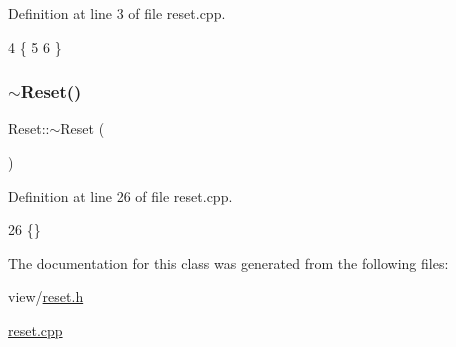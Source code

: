 Definition at line 3 of file reset.\+cpp.


\begin{DoxyCode}
4 \{
5 
6 \}
\end{DoxyCode}
\hypertarget{class_reset_a1d5b1c4b9325560ff386c64e3e6de0f0}{}\label{class_reset_a1d5b1c4b9325560ff386c64e3e6de0f0} 
\subsubsection{\texorpdfstring{$\sim$\+Reset()}{~Reset()}}
{\footnotesize\ttfamily Reset\+::$\sim$\+Reset (\begin{DoxyParamCaption}{ }\end{DoxyParamCaption})}



Definition at line 26 of file reset.\+cpp.


\begin{DoxyCode}
26 \{\}
\end{DoxyCode}


The documentation for this class was generated from the following files\+:\begin{DoxyCompactItemize}
\item 
view/\hyperlink{reset_8h}{reset.\+h}\item 
\hyperlink{reset_8cpp}{reset.\+cpp}\end{DoxyCompactItemize}
